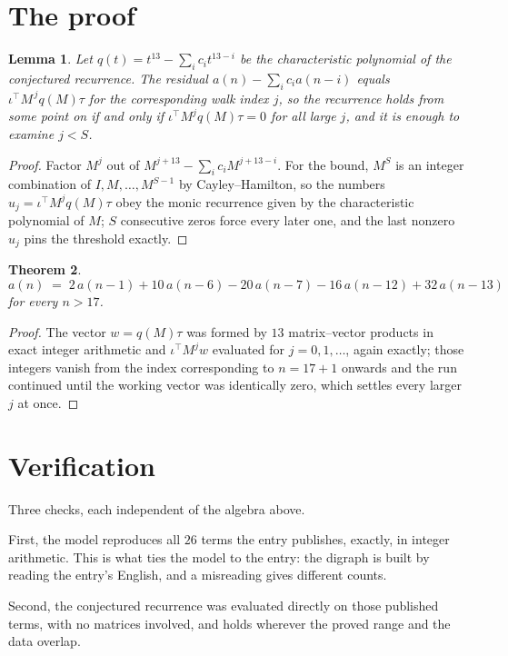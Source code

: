 \documentclass[11pt,a4paper]{article}
\theoremstyle{plain}
\newtheorem{theorem}{Theorem}
\newtheorem{lemma}[theorem]{Lemma}
\theoremstyle{definition}
\begin{document}
\section{The proof}

\begin{lemma}\label{lem:crit}
Let $q(t)=t^{13}-\sum_i c_it^{13-i}$ be the characteristic polynomial of the
conjectured recurrence. The residual $a(n)-\sum_ic_ia(n-i)$ equals
$\iota^{\!\top}M^{\,j}q(M)\tau$ for the corresponding walk index $j$, so the recurrence
holds from some point on if and only if $\iota^{\!\top}M^{j}q(M)\tau=0$ for all large $j$,
and it is enough to examine $j<S$.
\end{lemma}

\begin{proof}
Factor $M^{j}$ out of $M^{j+13}-\sum_ic_iM^{j+13-i}$. For the bound, $M^{S}$
is an integer combination of $I,M,\dots,M^{S-1}$ by Cayley--Hamilton, so the numbers
$u_j=\iota^{\!\top}M^{j}q(M)\tau$ obey the monic recurrence given by the characteristic
polynomial of $M$; $S$ consecutive zeros force every later one, and the last nonzero $u_j$
pins the threshold exactly.
\end{proof}

\begin{theorem}
\[
a(n)\;=\;2\,a(n-1) + 10\,a(n-6) - 20\,a(n-7) - 16\,a(n-12) + 32\,a(n-13)
\]
for every $n>17$.
\end{theorem}

\begin{proof}
The vector $w=q(M)\tau$ was formed by $13$ matrix--vector products in exact integer
arithmetic and $\iota^{\!\top}M^{j}w$ evaluated for $j=0,1,\dots$, again exactly; those
integers vanish from the index corresponding to $n=17+1$ onwards and the run continued
until the working vector was identically zero, which settles every larger $j$ at once.
\end{proof}

\section{Verification}

Three checks, each independent of the algebra above.

First, the model reproduces all $26$ terms the entry publishes, exactly, in integer
arithmetic. This is what ties the model to the entry: the digraph is built by reading the
entry's English, and a misreading gives different counts.

Second, the conjectured recurrence was evaluated directly on those published terms, with no
matrices involved, and holds wherever the proved range and the data overlap.
\end{document}
